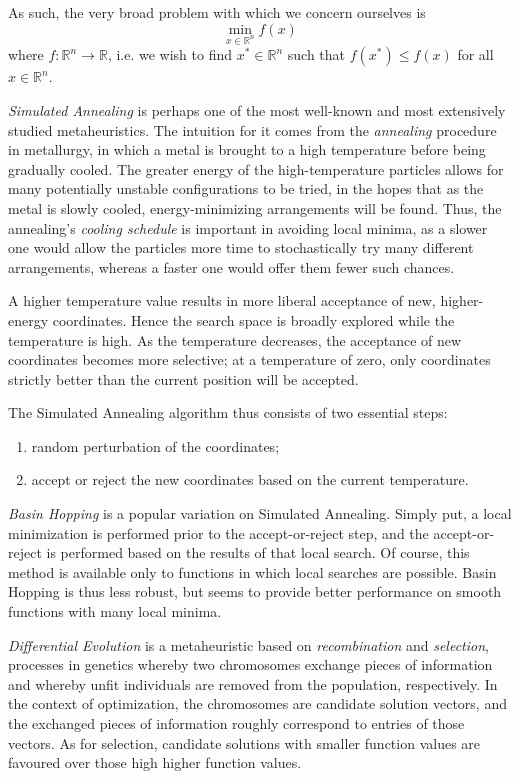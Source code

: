 \documentclass[12pt]{article}
\begin{document}
    As such, the very broad problem with which we concern ourselves is
    $$
    \min_{x \in \mathbb{R}^n} f(x)
    $$
    where $f : \mathbb{R}^n \to \mathbb{R}$,
    i.e. we wish to find $x^* \in \mathbb{R}^n$
    such that $f(x^*) \leq f(x)$ for all $x \in \mathbb{R}^n$.

    \emph{Simulated Annealing}\cite{kirkpatrick1983} is perhaps one of the most
    well-known and most extensively studied metaheuristics.
    The intuition for it comes from the \emph{annealing} procedure in
    metallurgy, in which a metal is brought to a high temperature before being
    gradually cooled.
    The greater energy of the high-temperature particles allows for many
    potentially unstable configurations to be tried, in the hopes that as the
    metal is slowly cooled, energy-minimizing arrangements will be found.
    Thus, the annealing's \emph{cooling schedule} is important in avoiding
    local minima, as a slower one would allow the particles more time to
    stochastically try many different arrangements, whereas a faster one would
    offer them fewer such chances.

    A higher temperature value results in more liberal acceptance of new,
    higher-energy coordinates.
    Hence the search space is broadly explored while the temperature is high.
    As the temperature decreases, the acceptance of new coordinates becomes
    more selective; at a temperature of zero, only coordinates strictly better
    than the current position will be accepted.

    The Simulated Annealing algorithm thus consists of two essential steps:
    \begin{enumerate}
        \item random perturbation of the coordinates;
        \item accept or reject the new coordinates based on the current
            temperature.
    \end{enumerate}

    \emph{Basin Hopping}\cite{wales1997} is a popular variation on Simulated
    Annealing.
    Simply put, a local minimization is performed prior to the accept-or-reject
    step, and the accept-or-reject is performed based on the results of that
    local search.
    Of course, this method is available only to functions in which local
    searches are possible.
    Basin Hopping is thus less robust, but seems to provide better performance
    on smooth functions with many local minima.

    \emph{Differential Evolution}\cite{storn1997} is a metaheuristic based on
    \emph{recombination} and \emph{selection}, processes in genetics whereby
    two chromosomes exchange pieces of information and whereby unfit
    individuals are removed from the population, respectively.
    In the context of optimization, the chromosomes are candidate solution
    vectors, and the exchanged pieces of information roughly correspond to
    entries of those vectors. As for selection, candidate solutions with
    smaller function values are favoured over those high higher function
    values.
\end{document}
